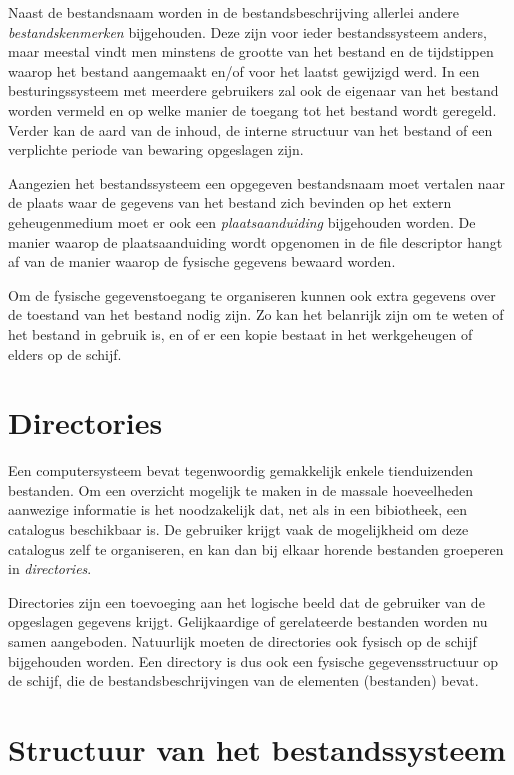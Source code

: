Naast de bestandsnaam worden in de bestandsbeschrijving allerlei
andere \emph{bestandskenmerken} bijgehouden. Deze zijn
voor ieder bestandssysteem anders, maar meestal vindt men minstens de
grootte van het bestand en de tijdstippen waarop het bestand aangemaakt
en/of voor het laatst gewijzigd werd. In een besturingssysteem met
meerdere gebruikers zal ook de eigenaar van het bestand worden vermeld en
op welke manier de toegang tot het bestand wordt geregeld. Verder kan de
aard van de inhoud, de interne structuur van het bestand of een
verplichte periode van bewaring opgeslagen zijn.

Aangezien het bestandssysteem een opgegeven bestandsnaam moet
vertalen naar de plaats waar de gegevens van het bestand zich bevinden
op het extern geheugenmedium moet er ook een
\emph{plaatsaanduiding} bijgehouden worden. De manier
waarop de plaatsaanduiding wordt opgenomen in de file descriptor hangt
af van de manier waarop de fysische gegevens bewaard worden.

Om de fysische gegevenstoegang te organiseren kunnen ook extra
gegevens over de toestand van het bestand nodig zijn. Zo kan het
belanrijk zijn om te weten of het bestand in gebruik is, en of er een
kopie bestaat in het werkgeheugen of elders op de schijf.

\section{Directories}

Een computersysteem bevat tegenwoordig gemakkelijk enkele
tienduizenden bestanden. Om een overzicht mogelijk te maken in de
massale hoeveelheden aanwezige informatie is het noodzakelijk dat, net
als in een bibiotheek, een catalogus beschikbaar is. De gebruiker krijgt
vaak de mogelijkheid om deze catalogus zelf te organiseren, en kan dan
bij elkaar horende bestanden groeperen in
\emph{directories}.

Directories zijn een toevoeging aan het logische beeld dat de
gebruiker van de opgeslagen gegevens krijgt. Gelijkaardige of
gerelateerde bestanden worden nu samen aangeboden. Natuurlijk moeten de
directories ook fysisch op de schijf bijgehouden worden. Een directory
is dus ook een fysische gegevensstructuur op de schijf, die de
bestandsbeschrijvingen van de elementen (bestanden) bevat.

\section{Structuur van het bestandssysteem}

